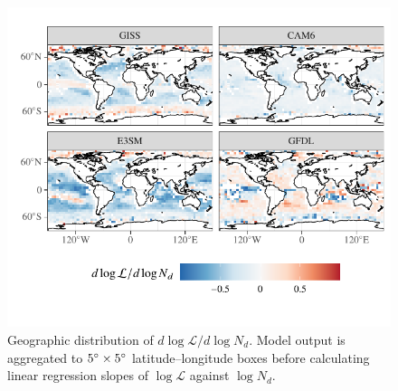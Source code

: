 \documentclass[acp, manuscript]{copernicus}\usepackage[]{graphicx}\usepackage[]{xcolor}
\newenvironment{knitrout}{}{} %
\newcommand{\jmu}{\ensuremath{j_\mu}}
\newcommand{\jmcomment}[1]{\todo[inline, color=red!50]{\jmu: #1}}
\newcommand\nd{\ensuremath{N_d}}
\newcommand\lwp{\ensuremath{\mathcal L}}
\begin{document}
\begin{figure}
  \centering
\begin{knitrout}
\color{fgcolor}

{\centering \includegraphics[width=12cm]{figure/multimodel-lon-lat-susc-plot-1} 

}


\end{knitrout}
  \caption{Geographic distribution of $d\log\lwp/d\log\nd$.  Model output is aggregated to $5^{\circ}\times 5^{\circ}$ latitude--longitude boxes before calculating linear regression slopes of $\log\lwp$ against $\log\nd$.}
  \label{fig:multimodel-lon-lat-susc}
\end{figure}
%
\clearpage
%
%
%
%
\end{document}
